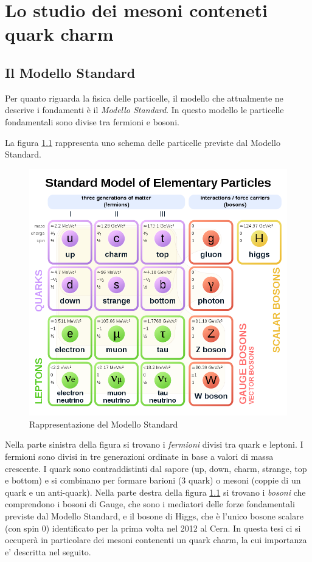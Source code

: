 \chapter{Lo studio dei mesoni conteneti quark charm }

\section{Il Modello Standard}
Per quanto riguarda la fisica delle particelle, il modello che attualmente ne descrive i fondamenti è il \textit{Modello Standard}. In questo modello le particelle fondamentali sono divise tra fermioni e bosoni. 

La figura \ref{fig:ModelloStandard} rappresenta uno schema delle particelle previste dal Modello Standard.
    \begin{figure}[htbp]
        \centering
        \includegraphics[width=0.65\linewidth]{introParticelle/ModelloStandard.png}
        \caption{Rappresentazione del Modello Standard}
        \label{fig:ModelloStandard}
    \end{figure}
Nella parte sinistra della figura si trovano i \textit{fermioni} divisi tra quark e leptoni. I fermioni sono divisi in tre generazioni ordinate in base a valori di massa crescente. I quark sono contraddistinti dal sapore (up, down, charm, strange, top e bottom) e si combinano per formare barioni (3 quark) o mesoni (coppie di un quark e un anti-quark). Nella parte destra della figura \ref{fig:ModelloStandard} si trovano i \textit{bosoni} che comprendono i bosoni di Gauge, che sono i mediatori delle forze fondamentali previste dal Modello Standard, e il bosone di Higgs, che è l'unico bosone scalare (con spin 0) identificato per la prima volta nel 2012 al Cern. In questa tesi ci si occuper\`a in particolare dei mesoni contenenti un quark charm, la cui importanza e' descritta nel seguito.
 
